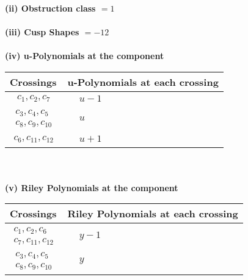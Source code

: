 \documentclass[1p]{elsarticle_modified}
\theoremstyle{definition}
\begin{document}
\flushleft \textbf{(ii) Obstruction class $= 1$}\\~\\
\flushleft \textbf{(iii) Cusp Shapes $= -12$}\\~\\
\newpage\renewcommand{\arraystretch}{1}
\flushleft \textbf{(iv) u-Polynomials at the component}\newline \\
\begin{tabular}{m{50pt}|m{274pt}}
Crossings & \hspace{64pt}u-Polynomials at each crossing \\
\hline $$\begin{aligned}c_{1},c_{2},c_{7}\end{aligned}$$&$\begin{aligned}
&u-1
\end{aligned}$\\
\hline $$\begin{aligned}c_{3},c_{4},c_{5}\\c_{8},c_{9},c_{10}\end{aligned}$$&$\begin{aligned}
&u
\end{aligned}$\\
\hline $$\begin{aligned}c_{6},c_{11},c_{12}\end{aligned}$$&$\begin{aligned}
&u+1
\end{aligned}$\\
\hline
\end{tabular}\\~\\
\newpage\renewcommand{\arraystretch}{1}
\flushleft \textbf{(v) Riley Polynomials at the component}\newline \\
\begin{tabular}{m{50pt}|m{274pt}}
Crossings & \hspace{64pt}Riley Polynomials at each crossing \\
\hline $$\begin{aligned}c_{1},c_{2},c_{6}\\c_{7},c_{11},c_{12}\end{aligned}$$&$\begin{aligned}
&y-1
\end{aligned}$\\
\hline $$\begin{aligned}c_{3},c_{4},c_{5}\\c_{8},c_{9},c_{10}\end{aligned}$$&$\begin{aligned}
&y
\end{aligned}$\\
\hline
\end{tabular}\\~\\
\end{document}
